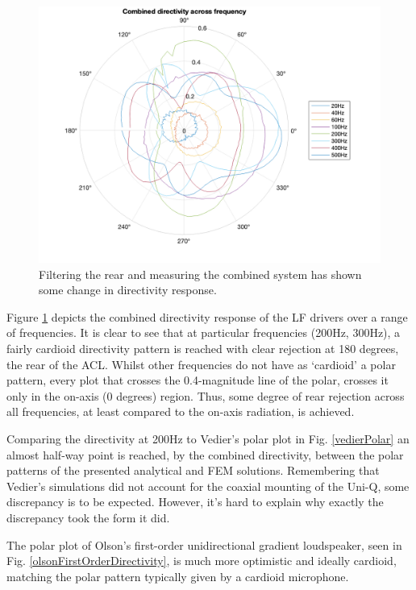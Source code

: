 \documentclass{report}
\begin{document}
            \begin{figure}[H]
                \centering
                \includegraphics[width=0.8\linewidth]{figs/filteredCombinedDirectivity.png}
                \caption{Filtering the rear and measuring the combined system has shown some change in directivity response.}
                \label{filteredCombinedDirectivity}
            \end{figure}

            Figure \ref{filteredCombinedDirectivity} depicts the combined directivity response of the LF drivers over a range of frequencies.
            It is clear to see that at particular frequencies (200Hz, 300Hz), a fairly cardioid directivity pattern is reached with clear rejection at 180 degrees, the rear of the ACL.
            Whilst other frequencies do not have as `cardioid' a polar pattern, every plot that crosses the 0.4-magnitude line of the polar, crosses it only in the on-axis (0 degrees) region.
            Thus, some degree of rear rejection across all frequencies, at least compared to the on-axis radiation, is achieved.

            Comparing the directivity at 200Hz to Vedier's polar plot in Fig. \ref{vedierPolar} an almost half-way point is reached, by the combined directivity, between the polar patterns of the presented analytical and FEM solutions.
            Remembering that Vedier's simulations did not account for the coaxial mounting of the Uni-Q, some discrepancy is to be expected.
            However, it's hard to explain why exactly the discrepancy took the form it did.

            The polar plot of Olson's first-order unidirectional gradient loudspeaker, seen in Fig. \ref{olsonFirstOrderDirectivity}, is much more optimistic and ideally cardioid, matching the polar pattern typically given by a cardioid microphone.
\end{document}
